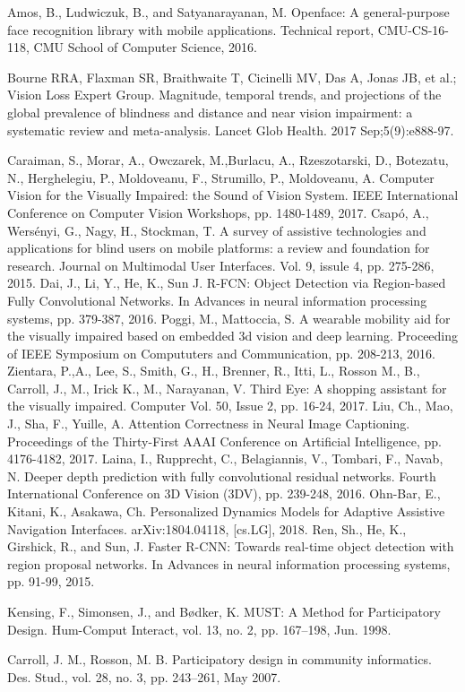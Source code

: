 \documentclass[a4paper,11pt]{article}
\begin{document}
\begin{thebibliography}{1}
 Amos, B., Ludwiczuk, B., and Satyanarayanan, M. Openface:
A general-purpose face recognition library with mobile applications. Technical report, CMU-CS-16-118, CMU School of Computer Science, 2016.

 Bourne RRA, Flaxman SR, Braithwaite T, Cicinelli MV, Das A, Jonas JB, et al.; Vision Loss Expert Group. Magnitude, temporal trends, and projections of the global prevalence of blindness and distance and near vision impairment: a systematic review and meta-analysis. Lancet Glob Health.  2017 Sep;5(9):e888-97.

 Caraiman, S., Morar, A., Owczarek, M.,Burlacu, A., Rzeszotarski, D., Botezatu, N., Herghelegiu, P., Moldoveanu, F., Strumillo, P., Moldoveanu, A. Computer Vision for the Visually Impaired: the Sound of Vision System. IEEE International Conference on Computer Vision Workshops, pp. 1480-1489, 2017.
 Csap\'{o}, A., Wers\'{e}nyi, G., Nagy, H., Stockman, T. A survey of assistive technologies and applications for blind users on mobile platforms: a review and foundation for research. Journal on Multimodal User Interfaces. Vol. 9, issule 4,  pp. 275-286, 2015.
 Dai, J., Li, Y., He, K., Sun J. R-FCN: Object Detection via Region-based Fully Convolutional Networks. In Advances in neural information processing systems, pp. 379-387, 2016.
 Poggi, M., Mattoccia, S. A wearable mobility aid for the visually impaired based on embedded 3d vision and deep learning. Proceeding of IEEE Symposium on Compututers and Communication, pp. 208-213, 2016.
 Zientara, P.,A., Lee, S., Smith, G., H., Brenner, R., Itti, L., Rosson M., B., Carroll, J., M., Irick K., M., Narayanan, V. Third Eye: A shopping assistant for the visually impaired. Computer Vol. 50, Issue 2, pp. 16-24, 2017.
 Liu, Ch., Mao, J., Sha, F., Yuille, A. Attention Correctness in Neural Image Captioning. Proceedings of the Thirty-First AAAI Conference on Artificial Intelligence, pp. 4176-4182, 2017.
 Laina, I., Rupprecht, C., Belagiannis, V., Tombari, F., Navab, N. Deeper depth prediction with fully convolutional residual networks. Fourth International Conference on 3D Vision (3DV), pp. 239-248, 2016.
  Ohn-Bar, E., Kitani, K., Asakawa, Ch. Personalized Dynamics Models for Adaptive Assistive Navigation Interfaces. arXiv:1804.04118, [cs.LG], 2018.
 Ren, Sh., He, K., Girshick, R., and Sun, J.  Faster R-CNN: Towards real-time object detection with region proposal networks. In Advances in neural information processing systems, pp. 91-99, 2015.

 Kensing, F., Simonsen, J., and Bødker, K. MUST: A Method for Participatory Design. Hum-Comput Interact, vol. 13, no. 2, pp. 167–198, Jun. 1998.

 Carroll, J. M., Rosson, M. B. Participatory design in community informatics. Des. Stud., vol. 28, no. 3, pp. 243–261, May 2007.

\end{thebibliography}
\end{document}
